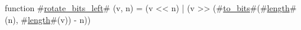 function #\hyperref[sailRISCVzrotatezybitszyleft]{rotate\_bits\_left}# (v, n) =
    (v << n) | (v >> (#\hyperref[sailRISCVztozybits]{to\_bits}#(#\hyperref[sailRISCVzlength]{length}#(n), #\hyperref[sailRISCVzlength]{length}#(v)) - n))
